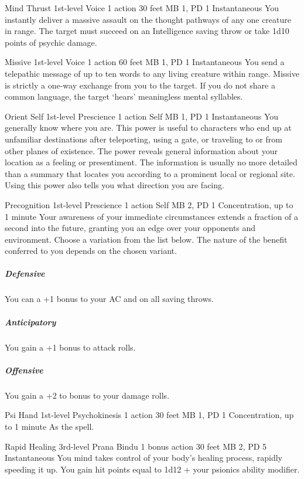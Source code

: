 \DndPowerHeader%
  {Mind Thrust}
  {1st-level Voice}
  {1 action}
  {30 feet}
  {MB 1, PD 1}
  {Instantaneous}
You instantly deliver a massive assault on the thought pathways
of any one creature in range.
The target must succeed on an Intelligence saving throw
or take 1d10 points of psychic damage.

\DndPowerHeader%
  {Missive}
  {1st-level Voice}
  {1 action}
  {60 feet}
  {MB 1, PD 1}
  {Instantaneous}
  You send a telepathic message of up to ten words to
  any living creature within range.
  Missive is strictly a one-way exchange from you to the target.
  If you do not share a common language,
  the target `hears' meaningless mental syllables.

\DndPowerHeader%
  {Orient Self}
  {1st-level Prescience}
  {1 action}
  {Self}
  {MB 1, PD 1}
  {Instantaneous}
You generally know where you are.
This power is useful to characters who end up at unfamiliar destinations
after teleporting,
using a gate,
or traveling to or from other planes of existence.
The power reveals general information about your location
as a feeling or presentiment.
The information is usually no more detailed than a summary
that locates you according to a prominent local or regional site.
Using this power also tells you what direction you are facing.

\DndPowerHeader%
  {Precognition}
  {1st-level Prescience}
  {1 action}
  {Self}
  {MB 2, PD 1}
  {Concentration, up to 1 minute}
Your awareness of your immediate circumstances extends
a fraction of a second into the future,
granting you an edge over your opponents and environment.
Choose a variation from the list below.
The nature of the benefit conferred to you
depends on the chosen variant.
\subparagraph{Defensive}
  You can a +1 bonus to your AC and on all saving throws.
\subparagraph{Anticipatory}
  You gain a +1 bonus to attack rolls.
\subparagraph{Offensive}
  You gain a +2 to bonus to your damage rolls.

\DndPowerHeader%
  {Psi Hand}
  {1st-level Psychokinesis}
  {1 action}
  {30 feet}
  {MB 1, PD 1}
  {Concentration, up to 1 minute}
As the  spell.

\DndPowerHeader%
  {Rapid Healing}
  {3rd-level Prana Bindu}
  {1 bonus action}
  {30 feet}
  {MB 2, PD 5}
  {Instantaneous}
You mind takes control of your body's healing process,
rapidly speeding it up.
You gain hit points equal to 1d12 + your psionics ability modifier.


